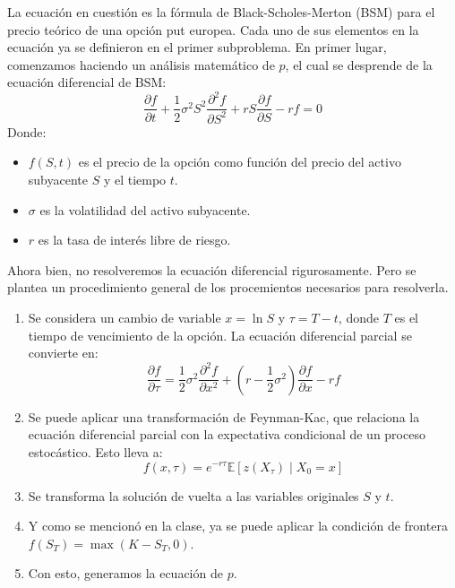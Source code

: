 \begin{problema}[Problema D]
\begin{itemize}
        \begin{sol}
            La ecuación en cuestión es la fórmula de Black-Scholes-Merton (BSM) para el precio teórico de una opción put europea. Cada uno de sus elementos en la ecuación ya se definieron en el primer subproblema. En primer lugar, comenzamos haciendo un análisis matemático de $p$, el cual se desprende de la ecuación diferencial de BSM:
            \begin{equation*}
                \frac{\partial f}{\partial t} + \frac{1}{2}\sigma^2 S^2 \frac{\partial^2 f}{\partial S^2} + rS\frac{\partial f}{\partial S} - rf = 0
                \end{equation*}
                Donde:
                \begin{itemize}
                    \item $f(S, t)$ es el precio de la opción como función del precio del activo subyacente $S$ y el tiempo $t$.
                    \item $\sigma$ es la volatilidad del activo subyacente.
                    \item $r$ es la tasa de interés libre de riesgo.        
                \end{itemize}

                Ahora bien, no resolveremos la ecuación diferencial rigurosamente. Pero se plantea un procedimiento general de los procemientos necesarios para resolverla. 
                \begin{enumerate}
                    \item Se considera un cambio de variable $x = \ln{S}$ y $\tau = T - t$, donde $T$ es el tiempo de vencimiento de la opción. La ecuación diferencial parcial se convierte en:
                    \begin{equation*}
                    \frac{\partial f}{\partial \tau} = \frac{1}{2}\sigma^2 \frac{\partial^2 f}{\partial x^2} + (r - \frac{1}{2}\sigma^2)\frac{\partial f}{\partial x} - rf
                    \end{equation*}
                    \item Se puede aplicar una transformación de Feynman-Kac, que relaciona la ecuación diferencial parcial con la expectativa condicional de un proceso estocástico. Esto lleva a:
                    \begin{equation*}
                    f(x, \tau) = e^{-r\tau} \mathbb{E} \left[ z(X_{\tau}) \middle| X_0 = x \right]
                    \end{equation*}
                    \item Se transforma la solución de vuelta a las variables originales $S$ y $t$.
                    \item Y como se mencionó en la clase, ya se puede aplicar la condición de frontera $f(S_T) = \max(K - S_T, 0)$. 
                    \item Con esto, generamos la ecuación de $p$.
                \end{enumerate}
                


\end{sol}
\end{itemize}
\end{problema}
